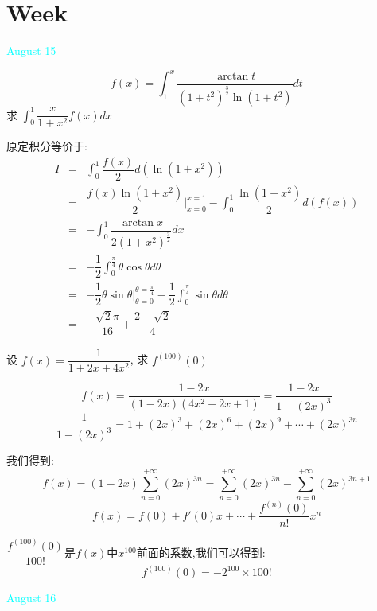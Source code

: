 \section{Week }
\textcolor{cyan}{August 15}

\begin{example}[][Exam: 34.3.1]
	$$f(x)=\int_{1}^{x}\dfrac{\arctan t}{(1+t^2)^{\frac{3}{2}}\ln(1+t^2)}dt$$
	求 $\int_{0}^{1}\dfrac{x}{1+x^2}f(x)dx$
\end{example}

\begin{solution}

	原定积分等价于:  
	\begin{eqnarray*}
		I&=&\int_{0}^{1}\dfrac{f(x)}{2}d(\ln(1+x^2))\\
		&=&\dfrac{f(x)\ln(1+x^2)}{2}|_{x=0}^{x=1}-\int_{0}^{1}\dfrac{\ln(1+x^2)}{2}d(f(x))\\
		&=&-\int_{0}^{1}\dfrac{\arctan x}{2(1+x^2)^{\frac{3}{2}}}dx\\
		&=&-\dfrac{1}{2}\int_{0}^{\frac{\pi}{4}}\theta\cos\theta d\theta\\
		&=&-\dfrac{1}{2}\theta\sin\theta|_{\theta=0}^{\theta=\frac{\pi}{4}}-\dfrac{1}{2}\int_{0}^{\frac{\pi}{4}}\sin \theta d\theta\\
		&=&-\dfrac{\sqrt{2}\pi}{16}+\dfrac{2-\sqrt{2}}{4}
	\end{eqnarray*}
\end{solution}

\begin{example}[][Exam: 34.3.2]
	设 $f(x)=\dfrac{1}{1+2x+4x^2}$, 求 $f^{(100)}(0)$
\end{example}

\begin{solution}

	$$f(x)=\dfrac{1-2x}{(1-2x)(4x^2+2x+1)}=\dfrac{1-2x}{1-(2x)^3}$$
	$$\dfrac{1}{1-(2x)^3}=1+(2x)^3+(2x)^6+(2x)^9+\cdots+(2x)^{3n}$$
	
	我们得到:$$f(x)=(1-2x)\sum\limits_{n=0}^{+\infty}(2x)^{3n}=\sum\limits_{n=0}^{+\infty}(2x)^{3n}-\sum\limits_{n=0}^{+\infty}(2x)^{3n+1}$$
	$$f(x)=f(0)+f'(0)x+\cdots+\dfrac{f^{(n)}(0)}{n!}x^n$$
	
	$\dfrac{f^{(100)}(0)}{100!}$是$f(x)$中$x^{100}$前面的系数,我们可以得到:  
	$$f^{(100)}(0)=-2^{100}\times100!$$
\end{solution}


\textcolor{cyan}{August 16}

